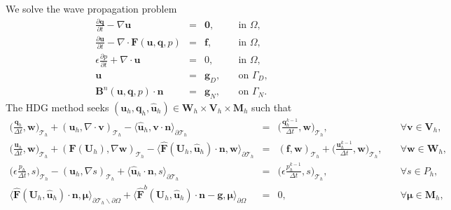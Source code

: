 \documentclass[11pt]{article}
\begin{document}
We solve the wave propagation problem
\begin{equation}
\begin{array}{rcll}
\displaystyle \frac{\partial \bm{q}}{\partial t} - \nabla \bm{u}  & = & \bm{0} , & \quad \mbox{in } \Omega, \\
\displaystyle \frac{\partial \bm{u}}{\partial t} - \nabla \cdot \bm{F} (\bm{u},\bm{q},p) & = & \bm{f}, & \quad \mbox{in } \Omega, \\
\displaystyle \epsilon \frac{\partial p}{\partial t} + \nabla \cdot \bm{u}  & = & 0 , & \quad \mbox{in } \Omega, \\
\bm{u} & = & \bm{g}_D, & \quad \mbox{on } \Gamma_D , \\
\bm{B}^n(\bm{u},\bm{q},p) \cdot \bm{n} & = & \bm{g}_N, & \quad \mbox{on } \Gamma_N .
\end{array}
\end{equation}
The HDG method seeks $(\bm{u}_h,\bm{q}_h,\widehat{\bm{u}}_h) \in \bm{W}_h \times \bm{V}_h \times \bm{M}_h$ such that
\begin{equation}
\begin{array}{rcll}
\displaystyle \Big(\frac{\bm{q}_h}{\Delta t}, \bm{w} \Big)_{\mathcal{T}_h} + (\bm{u}_h, \nabla \cdot \bm{v})_{\mathcal{T}_h} - \langle \widehat{\bm{u}}_h, \bm{v} \cdot \bm{n} \rangle_{\partial \mathcal{T}_h}  & = & \displaystyle \Big(\frac{\bm{q}^{k-1}_h}{\Delta t}, \bm{w} \Big)_{\mathcal{T}_h}, & \quad \forall \bm{v} \in \bm{V}_h, \\[2ex] 
\displaystyle \Big(\frac{\bm{u}_h}{\Delta t}, \bm{w} \Big)_{\mathcal{T}_h} + (\bm{F} (\bm{U}_h), \nabla \bm{w})_{\mathcal{T}_h} - \langle \widehat{\bm{F}} (\bm{U}_h,\widehat{\bm{u}}_h) \cdot \bm{n}, \bm{w} \rangle_{\partial \mathcal{T}_h} & = & (\bm{f}, \bm{w})_{\mathcal{T}_h} + \displaystyle \Big(\frac{\bm{u}_h^{k-1}}{\Delta t}, \bm{w} \Big)_{\mathcal{T}_h}, & \quad \forall \bm{w} \in \bm{W}_h, \\[2ex]
\displaystyle \Big(\epsilon \frac{p_h}{\Delta t}, s\Big)_{\mathcal{T}_h} - (\bm{u}_h, \nabla s)_{\mathcal{T}_h} + \langle \widehat{\bm{u}}_h \cdot \bm{n},s \rangle_{\partial \mathcal{T}_h}  & = & \displaystyle  \Big(\epsilon \frac{p^{k-1}_h}{\Delta t}, s\Big)_{\mathcal{T}_h}, & \quad \forall s \in P_h, \\[2ex] 
\langle \widehat{\bm{F}} (\bm{U}_h,\widehat{\bm{u}}_h) \cdot \bm{n}, \bm{\mu} \rangle_{\partial \mathcal{T}_h \backslash \partial \Omega} + \langle \widehat{\bm{F}}^b(\bm{U}_h,\widehat{\bm{u}}_h) \cdot \bm{n} - \bm{g}, \bm{\mu} \rangle_{\partial \Omega}  & = & 0, & \quad \forall \bm{\mu} \in \bm{M}_h ,
\end{array}
\end{equation}
\end{document}
